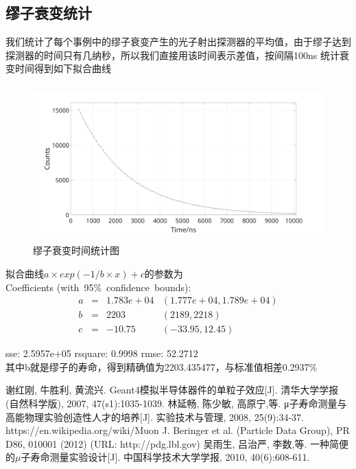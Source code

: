 \documentclass[UTF8]{ctexart}
\begin{document}
\subsection{缪子衰变统计}

我们统计了每个事例中的缪子衰变产生的光子射出探测器的平均值，由于缪子达到探测器的时间只有几纳秒，所以我们直接用该时间表示差值，按间隔100ns 统计衰变时间得到如下拟合曲线\\

\begin{figure}[H]
\centering
    \includegraphics[width=120mm,height=60mm]{pic/counts.jpg}
    \caption{缪子衰变时间统计图}
\end{figure}

拟合曲线$ a\times exp(-1/b\times x)+c$的参数为\\
Coefficients (with\ 95\%\ confidence\ bounds):
\begin{align}
      a & = & 1.783e+04 & (1.777e+04, 1.789e+04)\\
       b & =  &    2203 & (2189, 2218)\\
       c & =  & -10.75 & (-33.95, 12.45)
\end{align}

sse: 2.5957e+05 rsquare: 0.9998  rmse: 52.2712\\
其中b就是缪子的寿命，得到精确值为2203.435477，与标准值相差0.2937\%



\newpage
\begin{thebibliography}{123456}
谢红刚, 牛胜利, 黄流兴. Geant4模拟半导体器件的单粒子效应[J]. 清华大学学报(自然科学版), 2007, 47(s1):1035-1039.
林延畅, 陈少敏, 高原宁,等. μ子寿命测量与高能物理实验创造性人才的培养[J]. 实验技术与管理, 2008, 25(9):34-37.
https://en.wikipedia.org/wiki/Muon
J. Beringer et al. (Particle Data Group), PR D86, 010001 (2012) (URL: http://pdg.lbl.gov)
吴雨生, 吕治严, 李数,等. 一种简便的$\mu$子寿命测量实验设计[J]. 中国科学技术大学学报, 2010, 40(6):608-611.
\end{thebibliography}
\end{document}
